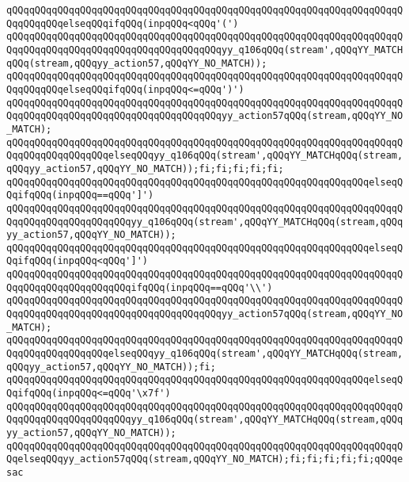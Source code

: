 \verb|qQQqqQQqqQQqqQQqqQQqqQQqqQQqqQQqqQQqqQQqqQQqqQQqqQQqqQQqqQQqqQQqqQQqqQQqqQQqqQQqelseqQQqifqQQq(inpqQQq<qQQq'(')|\newline
\verb|qQQqqQQqqQQqqQQqqQQqqQQqqQQqqQQqqQQqqQQqqQQqqQQqqQQqqQQqqQQqqQQqqQQqqQQqqQQqqQQqqQQqqQQqqQQqqQQqqQQqqQQqqQQqyy_q106qQQq(stream',qQQqYY_MATCHqQQq(stream,qQQqyy_action57,qQQqYY_NO_MATCH));|\newline
\verb|qQQqqQQqqQQqqQQqqQQqqQQqqQQqqQQqqQQqqQQqqQQqqQQqqQQqqQQqqQQqqQQqqQQqqQQqqQQqqQQqelseqQQqifqQQq(inpqQQq<=qQQq')')|\newline
\verb|qQQqqQQqqQQqqQQqqQQqqQQqqQQqqQQqqQQqqQQqqQQqqQQqqQQqqQQqqQQqqQQqqQQqqQQqqQQqqQQqqQQqqQQqqQQqqQQqqQQqqQQqqQQqyy_action57qQQq(stream,qQQqYY_NO_MATCH);|\newline
\verb|qQQqqQQqqQQqqQQqqQQqqQQqqQQqqQQqqQQqqQQqqQQqqQQqqQQqqQQqqQQqqQQqqQQqqQQqqQQqqQQqqQQqqQQqelseqQQqyy_q106qQQq(stream',qQQqYY_MATCHqQQq(stream,qQQqyy_action57,qQQqYY_NO_MATCH));fi;fi;fi;fi;fi;|\newline
\verb|qQQqqQQqqQQqqQQqqQQqqQQqqQQqqQQqqQQqqQQqqQQqqQQqqQQqqQQqqQQqqQQqelseqQQqifqQQq(inpqQQq==qQQq']')|\newline
\verb|qQQqqQQqqQQqqQQqqQQqqQQqqQQqqQQqqQQqqQQqqQQqqQQqqQQqqQQqqQQqqQQqqQQqqQQqqQQqqQQqqQQqqQQqqQQqyy_q106qQQq(stream',qQQqYY_MATCHqQQq(stream,qQQqyy_action57,qQQqYY_NO_MATCH));|\newline
\verb|qQQqqQQqqQQqqQQqqQQqqQQqqQQqqQQqqQQqqQQqqQQqqQQqqQQqqQQqqQQqqQQqelseqQQqifqQQq(inpqQQq<qQQq']')|\newline
\verb|qQQqqQQqqQQqqQQqqQQqqQQqqQQqqQQqqQQqqQQqqQQqqQQqqQQqqQQqqQQqqQQqqQQqqQQqqQQqqQQqqQQqqQQqqQQqifqQQq(inpqQQq==qQQq'\\')|\newline
\verb|qQQqqQQqqQQqqQQqqQQqqQQqqQQqqQQqqQQqqQQqqQQqqQQqqQQqqQQqqQQqqQQqqQQqqQQqqQQqqQQqqQQqqQQqqQQqqQQqqQQqqQQqqQQqyy_action57qQQq(stream,qQQqYY_NO_MATCH);|\newline
\verb|qQQqqQQqqQQqqQQqqQQqqQQqqQQqqQQqqQQqqQQqqQQqqQQqqQQqqQQqqQQqqQQqqQQqqQQqqQQqqQQqqQQqqQQqelseqQQqyy_q106qQQq(stream',qQQqYY_MATCHqQQq(stream,qQQqyy_action57,qQQqYY_NO_MATCH));fi;|\newline
\verb|qQQqqQQqqQQqqQQqqQQqqQQqqQQqqQQqqQQqqQQqqQQqqQQqqQQqqQQqqQQqqQQqelseqQQqifqQQq(inpqQQq<=qQQq'\x7f')|\newline
\verb|qQQqqQQqqQQqqQQqqQQqqQQqqQQqqQQqqQQqqQQqqQQqqQQqqQQqqQQqqQQqqQQqqQQqqQQqqQQqqQQqqQQqqQQqqQQqyy_q106qQQq(stream',qQQqYY_MATCHqQQq(stream,qQQqyy_action57,qQQqYY_NO_MATCH));|\newline
\verb|qQQqqQQqqQQqqQQqqQQqqQQqqQQqqQQqqQQqqQQqqQQqqQQqqQQqqQQqqQQqqQQqqQQqqQQqelseqQQqyy_action57qQQq(stream,qQQqYY_NO_MATCH);fi;fi;fi;fi;fi;qQQqesac|\newline
